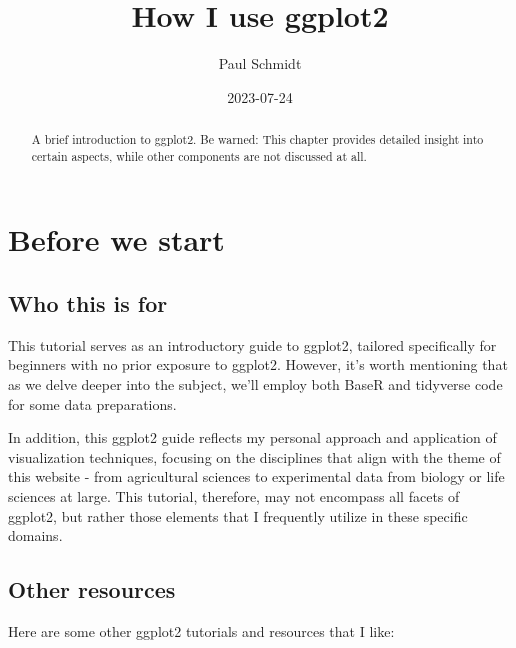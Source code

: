 \documentclass[
  letterpaper,
  DIV=11,
  numbers=noendperiod]{scrartcl}
\title{How I use ggplot2}
\author{Paul Schmidt}
\date{2023-07-24}
\renewcommand*\contentsname{Table of contents}
\newcommand\contentsname{Table of contents}
\begin{document}
\maketitle
\begin{abstract}
A brief introduction to ggplot2. Be warned: This chapter provides
detailed insight into certain aspects, while other components are not
discussed at all.
\end{abstract}
\ifdefined\Shaded\renewenvironment{Shaded}{\begin{tcolorbox}[sharp corners, breakable, frame hidden, enhanced, borderline west={3pt}{0pt}{shadecolor}, interior hidden, boxrule=0pt]}{\end{tcolorbox}}\fi

\renewcommand*\contentsname{Table of contents}
{
\hypersetup{linkcolor=}
\setcounter{tocdepth}{3}
\tableofcontents
}
\hypertarget{before-we-start}{%
\section{Before we start}\label{before-we-start}}

\hypertarget{who-this-is-for}{%
\subsection{Who this is for}\label{who-this-is-for}}

This tutorial serves as an introductory guide to ggplot2, tailored
specifically for beginners with no prior exposure to ggplot2. However,
it's worth mentioning that as we delve deeper into the subject, we'll
employ both BaseR and tidyverse code for some data preparations.

In addition, this ggplot2 guide reflects my personal approach and
application of visualization techniques, focusing on the disciplines
that align with the theme of this website - from agricultural sciences
to experimental data from biology or life sciences at large. This
tutorial, therefore, may not encompass all facets of ggplot2, but rather
those elements that I frequently utilize in these specific domains.

\hypertarget{other-resources}{%
\subsection{Other resources}\label{other-resources}}

Here are some other ggplot2 tutorials and resources that I like:
\end{document}
